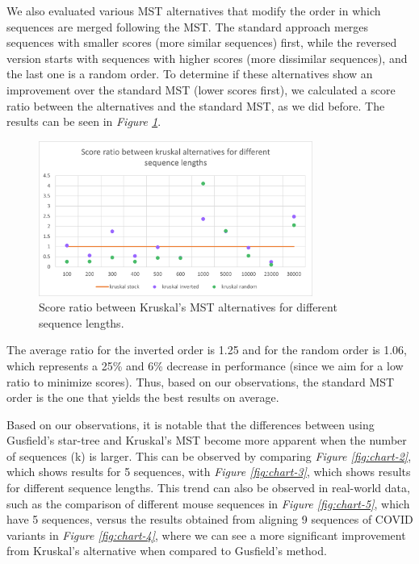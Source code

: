\documentclass[twoside,openright,titlepage,numbers=noenddot,headinclude,%
                footinclude=true,cleardoublepage=empty,abstractoff, %
                BCOR=5mm,paper=a4,fontsize=11pt,%
                ngerman,american,%
                ]{scrreprt}
\begin{document}
We also evaluated various MST alternatives that modify the order in which sequences are merged following the MST. The standard approach merges sequences with smaller scores (more similar sequences) first, while the reversed version starts with sequences with higher scores (more dissimilar sequences), and the last one is a random order. To determine if these alternatives show an improvement over the standard MST (lower scores first), we calculated a score ratio between the alternatives and the standard MST, as we did before. The results can be seen in \textit{Figure \ref{fig:kruskalVSkruskal}}. 

\begin{figure}[H]
\includegraphics[width=0.8\textwidth]{kruskalsVSkruskal.png}
\centering
\caption{Score ratio between Kruskal's MST alternatives for different sequence lengths.}
\label{fig:kruskalVSkruskal}
\end{figure}

The average ratio for the inverted order is 1.25 and for the random order is 1.06, which represents a 25\% and 6\% decrease in performance (since we aim for a low ratio to minimize scores). Thus, based on our observations, the standard MST order is the one that yields the best results on average.

Based on our observations, it is notable that the differences between using Gusfield's star-tree and Kruskal's MST become more apparent when the number of sequences (k) is larger. This can be observed by comparing \textit{Figure \ref{fig:chart-2}}, which shows results for 5 sequences, with \textit{Figure \ref{fig:chart-3}}, which shows results for different sequence lengths. This trend can also be observed in real-world data, such as the comparison of different mouse sequences in \textit{Figure \ref{fig:chart-5}}, which have 5 sequences, versus the results obtained from aligning 9 sequences of COVID variants in \textit{Figure \ref{fig:chart-4}}, where we can see a more significant improvement from Kruskal's alternative when compared to Gusfield's method.
\end{document}

